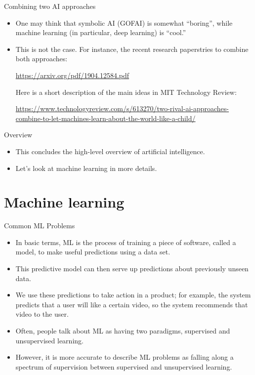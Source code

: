 \documentclass{beamer}
\begin{document}
\begin{frame}{Combining two AI approaches}
\begin{itemize}
\item One may think that symbolic AI (GOFAI) is somewhat ``boring'', while machine learning (in particular, deep learning) is ``cool.''

\item This is not the case. For instance, the recent research paperstries to combine both approaches:

\medskip
\url{https://arxiv.org/pdf/1904.12584.pdf}

\medskip
Here is a short description of the main ideas in MIT  Technology Review:

{\tiny \url{https://www.technologyreview.com/s/613270/two-rival-ai-approaches-combine-to-let-machines-learn-about-the-world-like-a-child/}}
\end{itemize}
\end{frame}

\begin{frame}{Overview}
\begin{itemize}
\item This concludes the high-level overview of artificial intelligence.

\item Let's look at machine learning in more details.
\end{itemize}
\end{frame}

%
%
%

\section{Machine learning}

\begin{frame}{Common ML Problems}

\begin{itemize}

\item In basic terms, ML is the process of training a piece of software, called a model, to make useful predictions using a data set. 

\item This predictive model can then serve up predictions about previously unseen data. 

\item We use these predictions to take action in a product; for example, the system predicts that a user will like a certain video, so the system recommends that video to the user.

\item Often, people talk about ML as having two paradigms, supervised and unsupervised learning. 

\item However, it is more accurate to describe ML problems as falling along a spectrum of supervision between supervised and unsupervised learning.
\end{itemize}

\end{frame}
\end{document}
